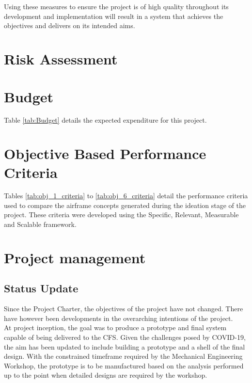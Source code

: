 \begin{appendices}
Using these measures to ensure the project is of high quality throughout its development and implementation will result in a system that achieves the objectives and delivers on its intended aims.
\clearpage
\newpage

\section{Risk Assessment}
\label{app_riskassessment}

\section{Budget}
\label{app_budget}
Table \ref{tab:Budget} details the expected expenditure for this project.


\clearpage
\newpage

\section{Objective Based Performance Criteria}
\label{app_performance_criteria}

Tables \ref{tab:obj_1_criteria} to \ref{tab:obj_6_criteria} detail the performance criteria used to compare the airframe concepts generated during the ideation stage of the project. These criteria were developed using the Specific, Relevant, Measurable and Scalable framework.



\newpage

\section{Project management}

\subsection{Status Update}
Since the Project Charter, the objectives of the project have not changed. There have however been developments in the overarching intentions of the project.\\

At project inception, the goal was to produce a prototype and final system capable of being delivered to the CFS. Given the challenges posed by COVID-19, the aim has been updated to include building a prototype and a shell of the final design. With the constrained timeframe required by the Mechanical Engineering Workshop, the prototype is to be manufactured based on the analysis performed up to the point when detailed designs are required by the workshop.




\end{appendices}
